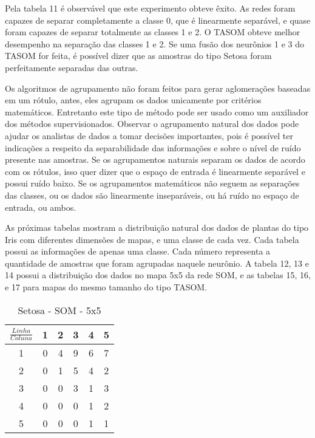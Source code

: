 Pela tabela 11 é observável que este experimento obteve êxito. As redes foram capazes de separar completamente a classe 0, que é linearmente separável, e quase foram capazes de separar totalmente as classes 1 e 2. O TASOM obteve melhor desempenho na separação das classes 1 e 2. Se uma fusão dos neurônios 1 e 3 do TASOM for feita, é possível dizer que as amostras do tipo Setosa foram perfeitamente separadas das outras. 
 
Os algoritmos de agrupamento não foram feitos para gerar aglomerações baseadas em um rótulo, antes, eles agrupam os dados unicamente por critérios matemáticos. Entretanto este tipo de método pode ser usado como um auxiliador dos métodos supervisionados. Observar o agrupamento natural dos dados pode ajudar os analistas de dados a tomar decisões importantes, pois é possível ter indicações a respeito da separabilidade das informações e sobre o nível de ruído presente nas amostras. Se os agrupamentos naturais separam os dados de acordo com os rótulos, isso quer dizer que o espaço de entrada é linearmente separável e possui ruído baixo. Se os agrupamentos matemáticos não seguem as separações das classes, ou os dados são linearmente inseparáveis, ou há ruído no espaço de entrada, ou ambos. 

As próximas tabelas mostram a distribuição natural dos dados de plantas do tipo Iris com diferentes dimensões de mapas, e uma classe de cada vez. Cada tabela possui as informações de apenas uma classe. Cada número representa a quantidade de amostras que foram agrupadas naquele neurônio. A tabela 12, 13 e 14 possui a distribuição dos dados no mapa 5x5 da rede SOM, e as tabelas 15, 16, e 17 para mapas do mesmo tamanho do tipo TASOM.


\begin{table}[]
\centering
\caption{Setosa - SOM - 5x5}
\label{my-label}
\begin{tabular}{|c|ccccc|}
\hline
$\frac{Linha}{Coluna}$ & \multicolumn{1}{c|}{1} & \multicolumn{1}{c|}{2}    & \multicolumn{1}{c|}{3}    & \multicolumn{1}{c|}{4}    & 5                         \\ \hline
1                      & 0                      & \cellcolor[HTML]{34CDF9}4 & \cellcolor[HTML]{34CDF9}9 & \cellcolor[HTML]{34CDF9}6 & \cellcolor[HTML]{34CDF9}7 \\ \cline{1-1}
2                      & 0                      & \cellcolor[HTML]{34CDF9}1 & \cellcolor[HTML]{34CDF9}5 & \cellcolor[HTML]{34CDF9}4 & \cellcolor[HTML]{34CDF9}2 \\ \cline{1-1}
3                      & 0                      & 0                         & \cellcolor[HTML]{34CDF9}3 & \cellcolor[HTML]{34CDF9}1 & \cellcolor[HTML]{34CDF9}3 \\ \cline{1-1}
4                      & 0                      & 0                         & 0                         & \cellcolor[HTML]{34CDF9}1 & \cellcolor[HTML]{34CDF9}2 \\ \cline{1-1}
5                      & 0                      & 0                         & 0                         & \cellcolor[HTML]{34CDF9}1 & \cellcolor[HTML]{34CDF9}1 \\ \hline
\end{tabular}
\end{table}


